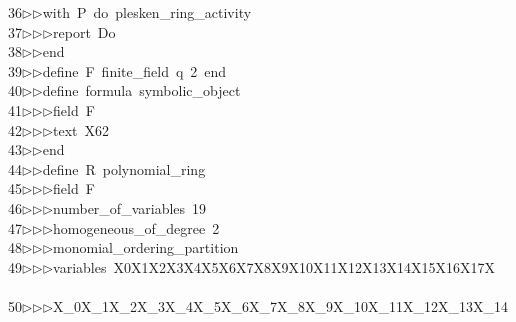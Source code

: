 \begin{tabbing}
36\>$\triangleright$\>$\triangleright$\>with\ P\ do\ plesken\_ring\_activity\ \\[0pt]
37\>$\triangleright$\>$\triangleright$\>$\triangleright$\>report\ Do\ \\[0pt]
38\>$\triangleright$\>$\triangleright$\>end\ \\[0pt]
39\>$\triangleright$\>$\triangleright$\>define\ F\ finite\_field\ q\ 2\ end\ \\[0pt]
40\>$\triangleright$\>$\triangleright$\>define\ formula\ symbolic\_object\ \\[0pt]
41\>$\triangleright$\>$\triangleright$\>$\triangleright$\>field\ F\ \\[0pt]
42\>$\triangleright$\>$\triangleright$\>$\triangleright$\>text\ X62\\[0pt]
43\>$\triangleright$\>$\triangleright$\>end\ \\[0pt]
44\>$\triangleright$\>$\triangleright$\>define\ R\ polynomial\_ring\ \\[0pt]
45\>$\triangleright$\>$\triangleright$\>$\triangleright$\>field\ F\ \\[0pt]
46\>$\triangleright$\>$\triangleright$\>$\triangleright$\>number\_of\_variables\ 19\ \\[0pt]
47\>$\triangleright$\>$\triangleright$\>$\triangleright$\>homogeneous\_of\_degree\ 2\ \\[0pt]
48\>$\triangleright$\>$\triangleright$\>$\triangleright$\>monomial\_ordering\_partition\ \\[0pt]
49\>$\triangleright$\>$\triangleright$\>$\triangleright$\>variables\ X0X1X2X3X4X5X6X7X8X9X10X11X12X13X14X15X16X17X\\[0pt]
\ \\[0pt]
50\>$\triangleright$\>$\triangleright$\>$\triangleright$\>X\_0X\_1X\_2X\_3X\_4X\_5X\_6X\_7X\_8X\_9X\_10X\_11X\_12X\_13X\_14\\[0pt]

\end{tabbing}
